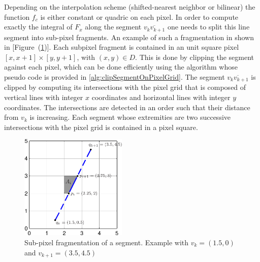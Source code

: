 \documentclass[11pt]{article}
\newcommand{\fig}[1]{[Figure~(#1)]}
\begin{document}
 Depending on the interpolation scheme (shifted-nearest neighbor or bilinear) the function $f_c$ is either constant or quadric on each pixel. In order to compute exactly the integral of $F_x$ along the segment $\overline{v_k v_{k+1}}$ one needs to split this line segment into sub-pixel fragments. An example of such a fragmentation in shown in \fig{\ref{fig:fragment_segment}}. Each subpixel fragment is contained in an unit square pixel $[x,x+1]\times[y,y+1]$, with $(x,y)\in D$.  This is done by clipping the segment against each pixel, which can be done efficiently using the algorithm whose pseudo code is provided in \ref{alg:clipSegmentOnPixelGrid}. The segment  $\overline{v_k v_{k+1}}$ is clipped by computing its intersections with the pixel grid that is composed of vertical lines with integer $x$ coordinates and horizontal lines with integer $y$ coordinates. The intersections are detected in an order such that their distance from $v_k$ is increasing. Each segment whose extremities are two successive intersections with the pixel grid is contained in a pixel square.

\begin{figure}[ht]
\begin{center}
\includegraphics[height=5cm]{fragment_segment_1.pdf}
\caption[]{Sub-pixel fragmentation of a segment. Example with $v_k=(1.5,0)$ and $v_{k+1}=(3.5,4.5)$}
\label{fig:fragment_segment}
\end{center}
\end{figure} 
\end{document}
